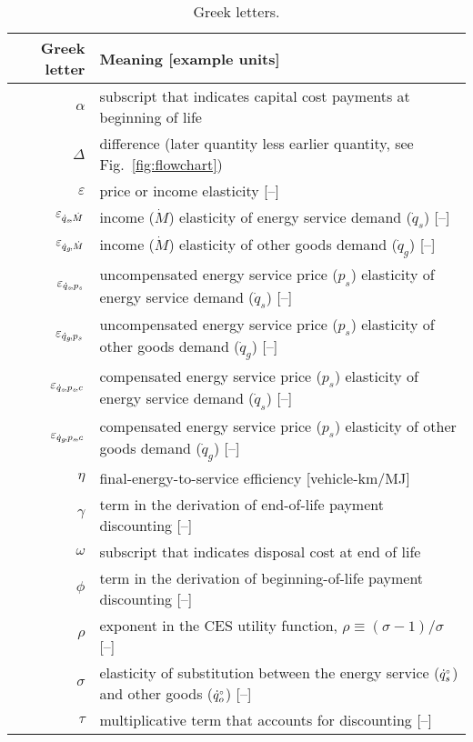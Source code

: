 
\begin{table}
\footnotesize
\centering %
\caption{Greek letters.}
\begin{tabular}{r l}
  \toprule
  Greek letter & Meaning [example units] \\
  \midrule
  $\alpha$       & subscript that indicates capital cost payments at beginning of life \\
  $\Delta$       & difference (later quantity less earlier quantity, see Fig.~\ref{fig:flowchart}) \\
  $\varepsilon$  & price or income elasticity [--] \\
  $\varepsilon_{\dot{q}_s\!,\dot{M}}$        & income ($\dot{M}$) elasticity of energy service demand ($\dot{q}_s$) [--] \\
  $\varepsilon_{\dot{q}_g\!,\dot{M}}$        & income ($\dot{M}$) elasticity of other goods demand ($\dot{q}_g$) [--] \\
  $\varepsilon_{\dot{q}_s\!,p_s}$     & uncompensated energy service price ($p_s$) elasticity of energy service demand ($\dot{q}_s$) [--] \\
  $\varepsilon_{\dot{q}_g\!,p_s}$     & uncompensated energy service price ($p_s$) elasticity of other goods demand ($\dot{q}_g$) [--] \\
  $\varepsilon_{\dot{q}_s\!,p_s\!,c}$      & compensated energy service price ($p_s$) elasticity of energy service demand ($\dot{q}_s$) [--] \\
  $\varepsilon_{\dot{q}_g\!,p_s\!,c}$      & compensated energy service price ($p_s$) elasticity of other goods demand ($\dot{q}_g$) [--] \\
  $\eta$         & final-energy-to-service efficiency [vehicle-km/MJ] \\
  $\gamma$       & term in the derivation of end-of-life payment discounting [--] \\
  $\omega$       & subscript that indicates disposal cost at end of life \\
  $\phi$         & term in the derivation of beginning-of-life payment discounting [--] \\
  $\rho$         & exponent in the CES utility function, $\rho \equiv (\sigma - 1) / \sigma$ [--] \\
  $\sigma$       & elasticity of substitution between the energy service (${}{\dot{q}}^{\scriptscriptstyle \circ}_s$) and other goods (${}{\dot{q}}^{\scriptscriptstyle \circ}_o$) [--] \\
  $\tau$         & multiplicative term that accounts for discounting [--] \\
  \bottomrule
\end{tabular}
\label{tab:greek}
\end{table}


